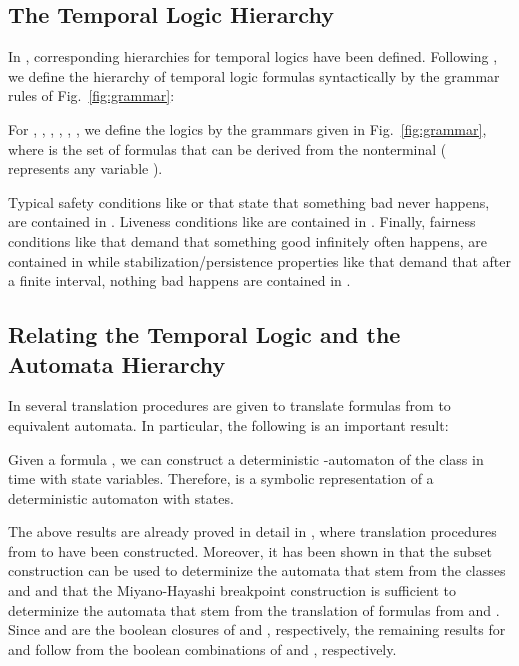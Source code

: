 \documentclass[submission,copyright,creativecommons]{eptcs}
\begin{document}
\subsection{The Temporal Logic Hierarchy}

In \cite{ChMP92,Schn01b,Schn03}, corresponding hierarchies for temporal logics have been defined. Following \cite{Schn01b,Schn03}, we define the hierarchy of temporal logic formulas syntactically by the grammar rules of Fig.~\ref{fig:grammar}:

\begin{figure*}[!th] 
\caption{Syntactic Characterizations of the Classes of the Temporal Logic Hierarchy}
\label{fig:grammar}
\end{figure*}


\begin{definition} \label{temp_borel_1_def}
For , , , , , , we define the logics  by the grammars given in Fig.~\ref{fig:grammar}, where  is the set of formulas that can be derived from the nonterminal  ( represents any variable ).
\end{definition}

\noindent Typical safety conditions like  or  that state that something bad never happens, are contained in . Liveness conditions like  are contained in . Finally, fairness conditions like  that demand that something good infinitely often happens, are contained in  while stabilization/persistence properties like  that demand that after a finite interval, nothing bad happens are contained in .




\subsection{Relating the Temporal Logic and the Automata Hierarchy}

In \cite{Schn01b,Schn03} several translation procedures are given to translate formulas from  to equivalent  automata. In particular, the following is an important result:

\begin{theorem} \label{borel_thm}
Given a formula , we can construct a deterministic -automaton  of the class  in time  with  state variables. Therefore,  is a symbolic representation of a deterministic automaton with  states.
\end{theorem}

\noindent The above results are already proved in detail in \cite{Schn03}, where translation procedures from  to  have been constructed. Moreover, it has been shown in \cite{Schn03} that the subset construction can be used to determinize the automata that stem from the classes  and  and that the Miyano-Hayashi breakpoint construction is sufficient to determinize the automata that stem from the translation of formulas from  and . Since  and  are the boolean closures of  and , respectively, the remaining results for  and  follow from the boolean combinations of  and , respectively. 
\end{document}

